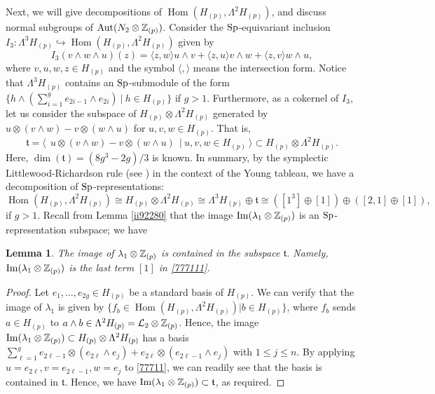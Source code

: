 \documentclass{article}
\theoremstyle{plain}
\newtheorem{lem}[thm]{Lemma}
\theoremstyle{definition}
\def\dim{\mathop{\mathrm{dim}}\nolimits}
\def\Im{\mathop{\mathrm{Im}}\nolimits}
\def\Hom{\mathop{\mathrm{Hom}}\nolimits}
\newcommand{\Z}{{\Bbb Z}}
\newcommand{\Aut}{{\rm Aut}}
\newcommand{\Sp}{{\rm Sp}}
\begin{document}
{Next, we will give decompositions of $\Hom( H_{(p)}, \Lambda^2 H_{(p)}) $, and discuss normal subgroups of $\Aut(N_2 \otimes \Z_{(p)}) $. Consider the $\Sp$-equivariant inclusion $I_3 : \Lambda^3 H_{(p)} \hookrightarrow \Hom( H_{(p)}, \Lambda^2 H_{(p)}) $ given by
\[ I_3( v \wedge w \wedge u ) (z)= \langle z , w\rangle u\wedge v + \langle z , u\rangle v\wedge w+\langle z , v\rangle w\wedge u,\]
where $v,u,w,z \in H_{(p)}$ and the symbol $\langle , \rangle $ means the intersection form. Notice that $\Lambda^3 H_{(p)}$ contains an $\Sp$-submodule of the form $ \{ h \wedge (\sum_{i=1}^g e_{2i-1}\wedge e_{2i} ) \ | \ h \in H_{(p)}\} $ if $g>1$. Furthermore, as a cokernel of $I_3$, let us consider the subspace of $H_{(p)}\otimes \Lambda^2 H_{(p)} $ generated by $ u \otimes( v\wedge w)- v\otimes ( w\wedge u)$ for $u,v,w \in H_{(p)}$. That is,
\begin{equation}\label{77711}
\mathfrak{t}= \langle \ \ u \otimes( v\wedge w)- v\otimes ( w\wedge u) \ \ | \ u,v,w \in H_{(p)} \ \rangle \subset H_{(p)}\otimes \Lambda^2 H_{(p)}.
\end{equation}
Here, $\dim (\mathfrak{t}) = (8g^3 -2g)/3 $ is known. In summary, by the symplectic Littlewood-Richardson rule (see \cite{KT}) in the context of the Young tableau, we have a decomposition of $\Sp$-representations:
\begin{equation}\label{777111}
\Hom( H_{(p)}, \Lambda^2 H_{(p)}) \cong H_{(p)} \otimes \Lambda^2 H_{(p)} \cong
\Lambda^3 H_{(p)} \oplus \mathfrak{t} \cong ( [1^3] \oplus [1]) \oplus ([2, 1] \oplus [1]),
\end{equation}
if $g>1$. Recall from Lemma \ref{ii92280} that the image $\mathrm{Im}(\lambda_1\otimes \Z_{(p)})$ is an $\Sp$-representation subspace; we have

\begin{lem}\label{lem49}
The image of $\lambda_1 \otimes \Z_{(p)}$ is contained in the subspace $\mathfrak{t}$. Namely, $\Im ( \lambda_1 \otimes \Z_{(p)}) $ is the last term $[1]$ in \eqref{777111}.
\end{lem}

\begin{proof}
Let $e_1, \dots, e_{2g} \in H_{(p)}$ be a standard basis of $H_{(p)}$. We can verify that the image of $\lambda_1$ is given by $ \{ f_b \in \Hom( H_{(p)}, \Lambda^2 H_{(p)}) | b \in H_{(p)} \}$, where $f_b$ sends $a \in H_{(p)}$ to $a \wedge b \in \Lambda^2 H_{(p)}= \mathcal{L}_2 \otimes \Z_{(p)}$. Hence, the image $\mathrm{Im}(\lambda_1\otimes \Z_{(p)})\subset H_{(p)} \otimes \Lambda^2 H_{(p)} $ has a basis $ \sum_{\ell=1}^g e_{2 \ell -1} \otimes (e_{2 \ell} \wedge e_j) + e_{2 \ell } \otimes (e_{2 \ell -1} \wedge e_j)$ with $ 1\leq j \leq n$. By applying $u=e_{2 \ell}, v =e_{2 \ell -1 },w=e_j$ to \eqref{77711}, we can readily see that the basis is contained in $ \mathfrak{t}$. Hence, we have $\mathrm{Im}(\lambda_1 \otimes \Z_{(p)}) \subset \mathfrak{t}$, as required.
\end{proof}

}
\end{document}
